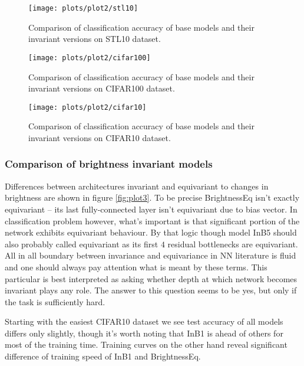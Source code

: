     \clearpage

    \begin{figure}[h!]
        \centering
        \texttt{[image: plots/plot2/stl10]}
        \caption{Comparison of classification accuracy of base models and their
            invariant versions on STL10 dataset.}
        \label{fig:plot2stl10}
    \end{figure}
    \begin{figure}[h!]
        \centering
        \texttt{[image: plots/plot2/cifar100]}
        \caption{Comparison of classification accuracy of base models and their
            invariant versions on CIFAR100 dataset.}
        \label{fig:plot2cifar100}
    \end{figure}
    \begin{figure}[h!]
        \centering
        \texttt{[image: plots/plot2/cifar10]}
        \caption{Comparison of classification accuracy of base models and their
            invariant versions on CIFAR10 dataset.}
        \label{fig:plot2cifar10}
    \end{figure}




    \subsubsection*{Comparison of brightness invariant models}
    Differences between architectures invariant and
    equivariant to changes in brightness are shown in figure \ref{fig:plot3}.
    To be precise BrightnessEq isn't
    exactly equivariant -- its last fully-connected layer isn't equivariant due
    to bias vector. In classification problem however, what's important
    is that significant portion of the network exhibits equivariant behaviour.
    By that logic though model InB5 should also probably called equivariant as
    its first $4$ residual bottlenecks are equivariant. All in all boundary
    between invariance and equivariance in NN literature is fluid and one should
    always pay attention what is meant by these terms. This particular is best
    interpreted as asking whether depth at which network becomes invariant plays
    any role. The answer to this question seems to be yes, but only if the task
    is sufficiently hard.

    Starting with the easiest CIFAR10 dataset we see test accuracy of all models
    differs only slightly, though it's worth noting that InB1 is ahead of others
    for most of the training time. Training curves on the other hand reveal
    significant difference of training speed of InB1 and BrightnessEq.

